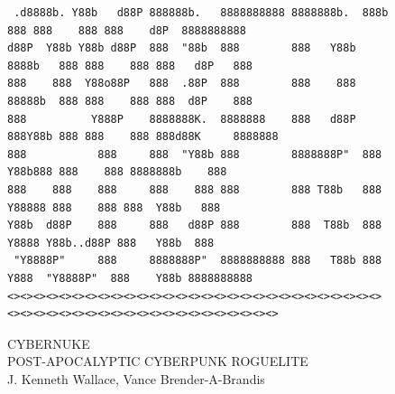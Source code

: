 \documentclass[10pt,conference,onecolumn,compsoc]{IEEEtran}
\begin{document}
\begin{figure}

\centering
\begin{footnotesize}
\begin{BVerbatim}
 .d8888b. Y88b   d88P 888888b.   8888888888 8888888b.  888b    888 888    888 888    d8P  8888888888 
d88P  Y88b Y88b d88P  888  "88b  888        888   Y88b 8888b   888 888    888 888   d8P   888        
888    888  Y88o88P   888  .88P  888        888    888 88888b  888 888    888 888  d8P    888        
888          Y888P    8888888K.  8888888    888   d88P 888Y88b 888 888    888 888d88K     8888888    
888           888     888  "Y88b 888        8888888P"  888 Y88b888 888    888 8888888b    888        
888    888    888     888    888 888        888 T88b   888  Y88888 888    888 888  Y88b   888        
Y88b  d88P    888     888   d88P 888        888  T88b  888   Y8888 Y88b..d88P 888   Y88b  888        
 "Y8888P"     888     8888888P"  8888888888 888   T88b 888    Y888  "Y8888P"  888    Y88b 8888888888 
<><><><><><><><><><><><><><><><><><><><><><><><><><><><><><><><><><><><><><><><><><><><><><><><><><>

\end{BVerbatim}
\end{footnotesize}

CYBERNUKE\\
{\small POST-APOCALYPTIC CYBERPUNK ROGUELITE}\\
J. Kenneth Wallace, Vance Brender-A-Brandis\\
\end{figure}


\end{document}

